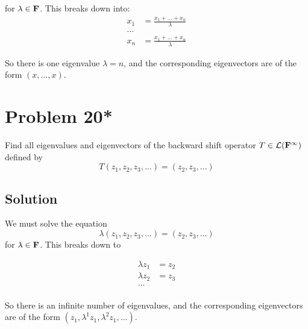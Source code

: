 \documentclass{article}
\begin{document}
for $\lambda\in\mathbf{F}$. This breaks down into:
\begin{align*}
    x_1&=\frac{x_1+\ldots+x_n}{\lambda}\\
    \ldots\\
    x_n&=\frac{x_1+\ldots+x_n}{\lambda}
\end{align*}

So there is one eigenvalue $\lambda=n$, and the corresponding eigenvectors are of the form $(x,\ldots,x)$.

\section*{Problem 20*}
Find all eigenvalues and eigenvectors of the backward shift operator $T\in\mathcal{L}(\mathbf{F}^\infty)$ defined by
\[T(z_1,z_2,z_3,\ldots)=(z_2,z_3,\ldots)\]

\subsection*{Solution}

We must solve the equation
\[\lambda(z_1,z_2,z_3,\ldots)=(z_2,z_3,\ldots)\]
for $\lambda\in\mathbf{F}$. This breaks down to

\begin{align*}
    \lambda z_1&=z_2\\
    \lambda z_2&=z_3\\
    \ldots\\
\end{align*}

So there is an infinite number of eigenvalues, and the corresponding eigenvectors are of the form $(z_1,\lambda^1z_1, \lambda^2z_1, \ldots)$.
\end{document}
